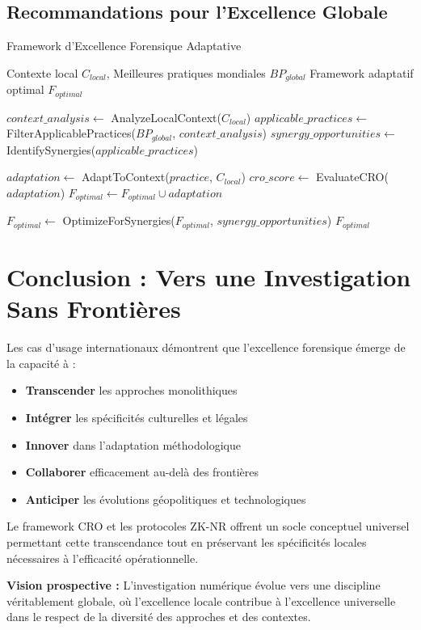\subsection{Recommandations pour l'Excellence Globale}

\begin{algorithm}
\caption{Framework d'Excellence Forensique Adaptative}
\begin{algorithmic}[1]
\REQUIRE Contexte local $C_{local}$, Meilleures pratiques mondiales $BP_{global}$
\ENSURE Framework adaptatif optimal $F_{optimal}$

\STATE $context\_analysis \leftarrow$ AnalyzeLocalContext($C_{local}$)
\STATE $applicable\_practices \leftarrow$ FilterApplicablePractices($BP_{global}$, $context\_analysis$)
\STATE $synergy\_opportunities \leftarrow$ IdentifySynergies($applicable\_practices$)

    \STATE $adaptation \leftarrow$ AdaptToContext($practice$, $C_{local}$)
    \STATE $cro\_score \leftarrow$ EvaluateCRO($adaptation$)
        \STATE $F_{optimal} \leftarrow F_{optimal} \cup adaptation$
    \ENDIF
\ENDFOR

\STATE $F_{optimal} \leftarrow$ OptimizeForSynergies($F_{optimal}$, $synergy\_opportunities$)
\RETURN $F_{optimal}$
\end{algorithmic}
\end{algorithm}

\section{Conclusion : Vers une Investigation Sans Frontières}

Les cas d'usage internationaux démontrent que l'excellence forensique émerge de la capacité à :

\begin{itemize}
\item \textbf{Transcender} les approches monolithiques
\item \textbf{Intégrer} les spécificités culturelles et légales
\item \textbf{Innover} dans l'adaptation méthodologique
\item \textbf{Collaborer} efficacement au-delà des frontières
\item \textbf{Anticiper} les évolutions géopolitiques et technologiques
\end{itemize}

Le framework CRO et les protocoles ZK-NR offrent un socle conceptuel universel permettant cette transcendance tout en préservant les spécificités locales nécessaires à l'efficacité opérationnelle.

\textbf{Vision prospective :} L'investigation numérique évolue vers une discipline véritablement globale, où l'excellence locale contribue à l'excellence universelle dans le respect de la diversité des approches et des contextes.